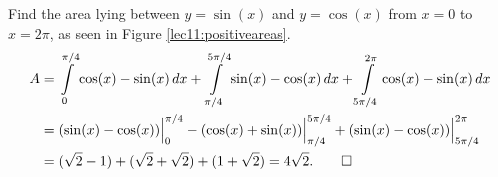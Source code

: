 \begin{example}
	Find the area lying between $y = \sin(x)$ and $y = \cos(x)$ from $x = 0$ to $x = 2 \pi$, as seen in Figure \ref{lec11:positiveareas}.
	\begin{align*}
		A & = \int\limits_0^{\pi/4} \cos(x) - \sin(x) \, d x + \int\limits_{\pi/4}^{5 \pi/4} \sin(x) - \cos(x) \, d x + \int\limits_{5 \pi/4}^{2\pi} \cos(x) - \sin(x) \, d x \\
		  & = (\sin(x) - \cos(x)) \Big \rvert_0^{\pi/4} - (\cos(x) + \sin(x)) \Big \rvert_{\pi/4}^{5 \pi/4} + (\sin(x) - \cos(x)) \Big \rvert_{5\pi/4}^{2\pi}                 \\
		  & = (\sqrt{2} - 1) + (\sqrt{2} + \sqrt{2}) + (1 + \sqrt{2}) = 4 \sqrt{2}. \qedhere
	\end{align*}
\end{example}
